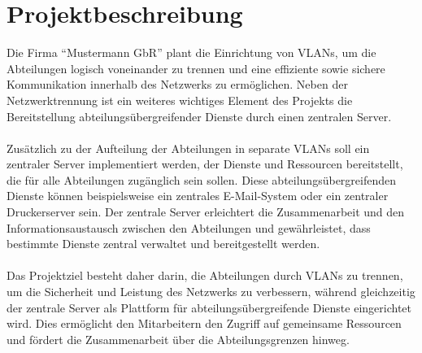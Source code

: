 \section{Projektbeschreibung}

Die Firma "`Mustermann GbR"' plant die Einrichtung von VLANs, um die Abteilungen logisch voneinander zu 
trennen und eine effiziente sowie sichere Kommunikation innerhalb des Netzwerks zu ermöglichen. Neben der 
Netzwerktrennung ist ein weiteres wichtiges Element des Projekts die Bereitstellung abteilungsübergreifender Dienste 
durch einen zentralen Server.
\\\\Zusätzlich zu der Aufteilung der Abteilungen in separate VLANs soll ein zentraler Server implementiert werden, der Dienste 
und Ressourcen bereitstellt, die für alle Abteilungen zugänglich sein sollen. Diese abteilungsübergreifenden Dienste können 
beispielsweise ein zentrales E-Mail-System oder ein zentraler Druckerserver sein. Der zentrale 
Server erleichtert die Zusammenarbeit und den Informationsaustausch zwischen den Abteilungen und gewährleistet, dass bestimmte 
Dienste zentral verwaltet und bereitgestellt werden.
\\\\Das Projektziel besteht daher darin, die Abteilungen durch VLANs zu trennen, um die Sicherheit und Leistung des Netzwerks zu 
verbessern, während gleichzeitig der zentrale Server als Plattform für abteilungsübergreifende Dienste eingerichtet wird. 
Dies ermöglicht den Mitarbeitern den Zugriff auf gemeinsame Ressourcen und fördert die Zusammenarbeit über die Abteilungsgrenzen 
hinweg.